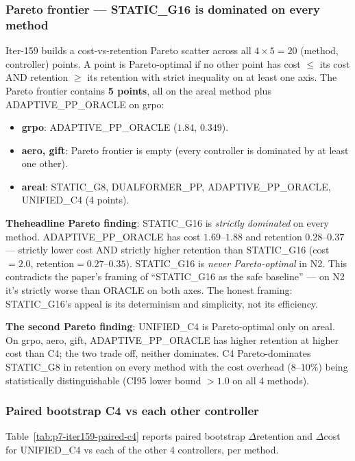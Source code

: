 \documentclass{article}
\begin{document}
\subsubsection*{Pareto frontier --- STATIC\_G16 is dominated on every method}

Iter-159 builds a cost-vs-retention Pareto scatter across all
$4 \times 5 = 20$ (method, controller) points. A point is Pareto-optimal if
no other point has cost $\leq$ its cost AND retention $\geq$ its retention
with strict inequality on at least one axis. The Pareto frontier contains
\textbf{5 points}, all on the areal method plus ADAPTIVE\_PP\_ORACLE on grpo:

\begin{itemize}
\item \textbf{grpo}: ADAPTIVE\_PP\_ORACLE ($1.84$, $0.349$).
\item \textbf{aero, gift}: Pareto frontier is empty (every controller is
      dominated by at least one other).
\item \textbf{areal}: STATIC\_G8, DUALFORMER\_PP, ADAPTIVE\_PP\_ORACLE, UNIFIED\_C4
      (4 points).
\end{itemize}

\textbf{Theheadline Pareto finding}: STATIC\_G16 is \emph{strictly dominated}
on every method. ADAPTIVE\_PP\_ORACLE has cost $1.69$--$1.88$ and retention
$0.28$--$0.37$ --- strictly lower cost AND strictly higher retention than
STATIC\_G16 (cost$=2.0$, retention$=0.27$--$0.35$). STATIC\_G16 is
\emph{never Pareto-optimal} in N2. This contradicts the paper's framing of
``STATIC\_G16 as the safe baseline'' --- on N2 it's strictly worse than
ORACLE on both axes. The honest framing: STATIC\_G16's appeal is its
determinism and simplicity, not its efficiency.

\textbf{The second Pareto finding}: UNIFIED\_C4 is Pareto-optimal only on
areal. On grpo, aero, gift, ADAPTIVE\_PP\_ORACLE has higher retention at
higher cost than C4; the two trade off, neither dominates. C4 Pareto-dominates
STATIC\_G8 in retention on every method with the cost overhead ($8$--$10\%$)
being statistically distinguishable (CI95 lower bound $> 1.0$ on all 4
methods).

\subsubsection*{Paired bootstrap C4 vs each other controller}

Table~\ref{tab:p7-iter159-paired-c4} reports paired bootstrap $\Delta$retention
and $\Delta$cost for UNIFIED\_C4 vs each of the other 4 controllers, per method.
\end{document}

